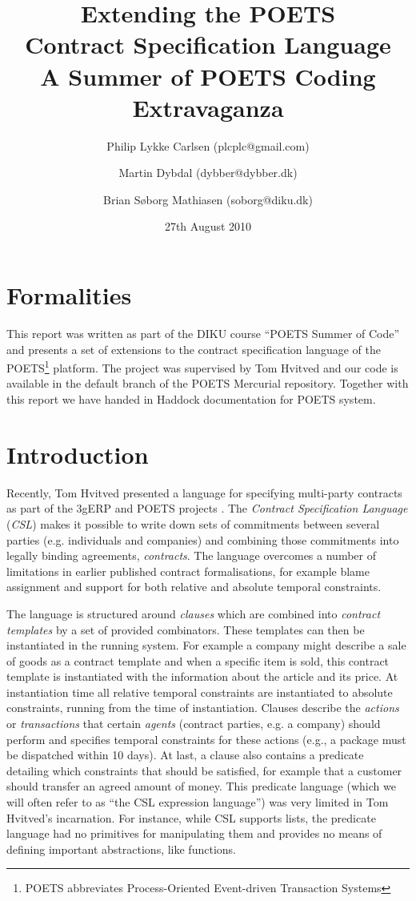 \documentclass[10pt,a4paper,final,oneside,openany,article]{memoir}
\title{Extending the POETS \\ Contract Specification Language\\
       \vspace{0.1cm}
        \small{A Summer of POETS Coding Extravaganza}}
\author{Philip Lykke Carlsen (plcplc@gmail.com) \and
        Martin Dybdal (dybber@dybber.dk) \and
        Brian Søborg Mathiasen (soborg@diku.dk)}
\date{27th August 2010}
\begin{document}


\maketitle

\chapter{Formalities}
This report was written as part of the DIKU course ``POETS Summer of
Code'' and presents a set of extensions to the contract specification
language of the POETS\footnote{POETS abbreviates Process-Oriented
  Event-driven Transaction Systems}
platform\cite{DBLP:journals/jlp/HengleinLSS09}. The project was
supervised by Tom Hvitved and our code is available in the default
branch of the POETS Mercurial repository. Together with this report we
have handed in Haddock documentation for POETS system.

\chapter{Introduction}

Recently, Tom Hvitved presented a language for specifying multi-party
contracts \cite{hvitved10} as part of the 3gERP and POETS projects
\cite{3gerp, DBLP:journals/jlp/HengleinLSS09}. The \textit{Contract Specification Language}
(\textit{CSL}) makes it possible to write down sets of commitments
between several parties (e.g. individuals and companies) and combining
those commitments into legally binding agreements, \textit{contracts}.
The language overcomes a number of limitations in earlier published
contract formalisations, for example blame assignment and support for
both relative and absolute temporal constraints.

The language is structured around \textit{clauses} which are combined
into \textit{contract templates} by a set of provided
combinators. These templates can then be instantiated in the running
system. For example a company might describe a sale of goods as a
contract template and when a specific item is sold, this contract
template is instantiated with the information about the article and
its price. At instantiation time all relative temporal constraints are
instantiated to absolute constraints, running from the time of
instantiation. Clauses describe the \textit{actions} or
\textit{transactions} that certain \textit{agents} (contract parties,
e.g. a company) should perform and specifies temporal constraints for
these actions (e.g., a package must be dispatched within 10 days). At
last, a clause also contains a predicate detailing which constraints
that should be satisfied, for example that a customer should transfer
an agreed amount of money. This predicate language (which we will
often refer to as ``the CSL expression language'') was very limited in
Tom Hvitved's incarnation. For instance, while CSL supports lists, the
predicate language had no primitives for manipulating them and
provides no means of defining important abstractions, like functions.
\end{document}
